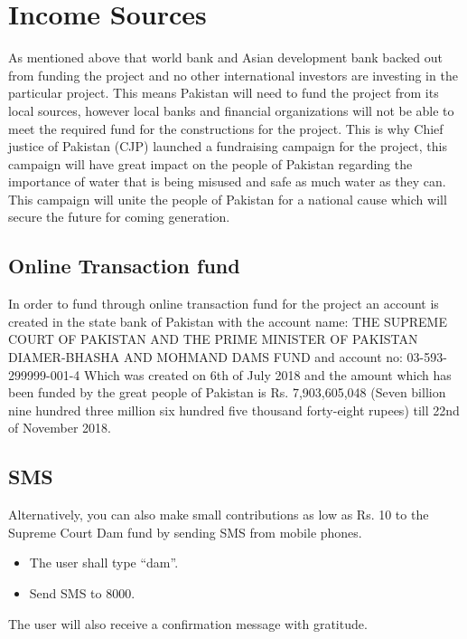 \documentclass[11pt, journal,letterpaper,compsoc]{IEEEtran}
\begin{document}
 \section{Income Sources}
 As mentioned above that world bank and Asian development bank backed out from funding the project and no other international investors are investing in the particular project. This means Pakistan will need to fund the project from its local sources, however local banks and financial organizations will not be able to meet the required fund for the constructions for the project. This is why Chief justice of Pakistan (CJP) launched a fundraising campaign for the project, this campaign will have great impact on the people of Pakistan regarding the importance of water that is being misused and safe as much water as they can. This campaign will unite the people of Pakistan for a national cause which will secure the future for coming generation.

\subsection{Online Transaction fund}
In order to fund through online transaction fund for the project an account is created in the state bank of Pakistan with the account name: THE SUPREME COURT OF PAKISTAN AND THE PRIME MINISTER OF PAKISTAN DIAMER-BHASHA AND MOHMAND DAMS FUND and account no: 03-593-299999-001-4 Which was created on 6th of July 2018 and the amount which has been funded by the great people of Pakistan is Rs. 7,903,605,048 (Seven billion nine hundred three million six hundred five thousand forty-eight rupees) till 22nd of November 2018.

\subsection{SMS}
Alternatively, you can also make small contributions as low as Rs. 10 to the Supreme Court Dam fund by sending SMS from mobile phones.
	
	\begin{itemize}
		\item The user shall type “dam”. 
		\item Send SMS to 8000. 
	\end{itemize}

The user will also receive a confirmation message with gratitude.
\end{document}
